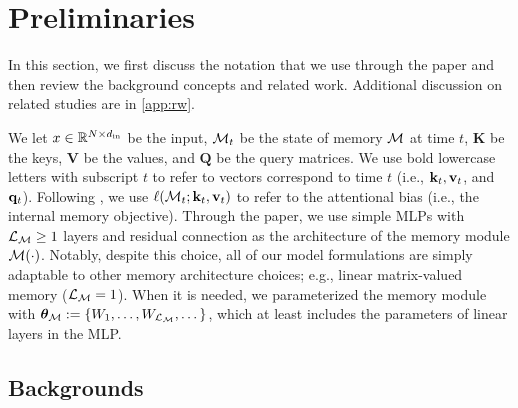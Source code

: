 \section{Preliminaries}\label{sec:prelim}

In this section, we first discuss the notation that we use through the paper and then review the background concepts and related work. 
Additional discussion on related studies are in \autoref{app:rw}. 

 We let $x \in \mathbb{R}^{N \times d_{\text{in}}}$ be the input, $\mathcal{M}_t$ be the state of memory $\mathcal{M}$ at time $t$, $\mathbf{K}$ be the keys, $\mathbf{V}$ be the values, and $\mathbf{Q}$ be the query matrices. We use bold lowercase letters with subscript $t$ to refer to vectors correspond to time $t$ (i.e., $\mathbf{k}_t, \mathbf{v}_t$, and $\mathbf{q}_t$). Following  \citet{behrouz2025Miras}, we use $\ell(\mathcal{M}_t; \mathbf{k}_t, \mathbf{v}_t)$ to refer to the attentional bias (i.e., the internal memory objective). Through the paper, we use simple MLPs with $\mathcal{L}_{\mathcal{M}} \geq 1$ layers and residual connection as the architecture of the memory module $\mathcal{M}(\cdot)$. Notably, despite this choice, all of our model formulations are simply adaptable to other memory architecture choices; e.g., linear matrix-valued memory ($\mathcal{L}_{\mathcal{M}} = 1$). When it is needed, we parameterized the memory module with $\boldsymbol{\theta}_{\mathcal{M}} := \{W_1, \dots, W_{\mathcal{L}_{\mathcal{M}}}, \dots \}$, which at least includes the parameters of linear layers in the MLP. 


\subsection{Backgrounds}

